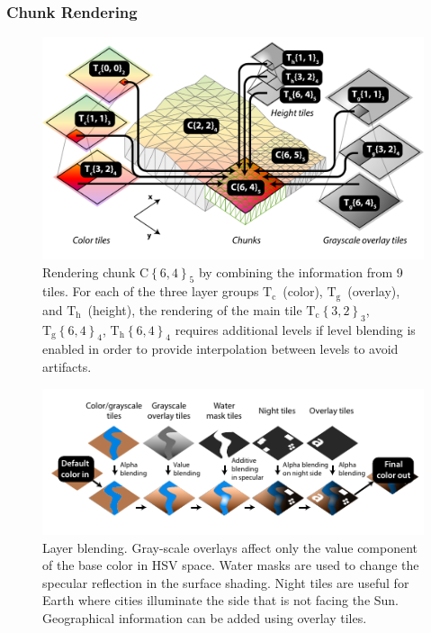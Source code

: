\documentclass[journal]{vgtc}                %
\newcommand{\kallecomment}[1]{\textbf{[-Kalle-~}
    \textcolor{orange}{#1}
    \textbf{~]}}
\begin{document}

\subsubsection{Chunk Rendering} \label{sec:chunkrendering}
\begin{figure}
  \centering
    \includegraphics[width=1.0\linewidth]{figures/chunks-and-tiles4.pdf}
  \caption{Rendering chunk $\textrm{C}\left\{ 6,4 \right\}_5$ by combining the information from 9 tiles. For each of the three layer groups $\textrm{T}_\textrm{c}$~(color), $\textrm{T}_\textrm{g}$~(overlay), and $\textrm{T}_\textrm{h}$~(height), the rendering of the main tile $\textrm{T}_\textrm{c}\left\{ 3,2 \right\}_3$,  $\textrm{T}_\textrm{g}\left\{ 6,4 \right\}_4$,  $\textrm{T}_\textrm{h}\left\{ 6,4 \right\}_4$ requires additional levels if level blending is enabled in order to provide interpolation between levels to avoid artifacts.}\vspace*{-3mm}
  \label{fig:chunks-and-tiles}
\end{figure}


\begin{figure}[b]
  \centering
    \includegraphics[width=1.0\linewidth]{figures/fragment-blending.pdf}
  \caption{Layer blending. Gray-scale overlays affect only the value component of the base color in HSV space. Water masks are used to change the specular reflection in the surface shading. Night tiles are useful for Earth where cities illuminate the side that is not facing the Sun. Geographical information can be added using overlay tiles.}
  \label{fig:fragpipe}
\end{figure}
\end{document}
